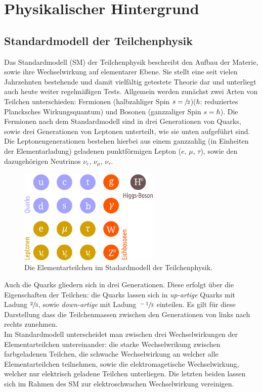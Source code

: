 \chapter{Physikalischer Hintergrund}
%
\section{Standardmodell der Teilchenphysik}
%
Das Standardmodell (SM) der Teilchenphysik beschreibt den Aufbau der Materie, sowie ihre Wechselwirkung auf elementarer Ebene. Sie stellt eine seit vielen Jahrzehnten bestehende und damit vielfältig getestete Theorie dar und unterliegt auch heute weiter regelmäßigen Tests. Allgemein werden zunächst zwei Arten von Teilchen unterschieden: Fermionen (halbzahliger Spin $s=\sfrac{\relax}{2}$)($\hbar$: reduziertes Plancksches Wirkungsquantum) und Bosonen (ganzzaliger Spin $s=\hbar$). Die Fermionen nach dem Standardmodell sind in drei Generationen von Quarks, sowie drei Generationen von Leptonen unterteilt, wie sie unten aufgeführt sind. Die Leptonengenerationen bestehen hierbei aus einem ganzzahlig (in Einheiten der Elementarladung) geladenen punktförmigen Lepton ($e$, $\mu$, $\tau$), sowie den dazugehörigen Neutrinos $\nu_e$, $\nu_\mu$, $\nu_\tau$.
%
\begin{figure}
  \centering
      \includegraphics[width=0.6\textwidth]{content/SM.pdf}
  \caption{Die Elementarteilchen im Stadardmodell der Teilchenphysik.}
\end{figure}
%
Auch die Quarks gliedern sich in drei Generationen. Diese erfolgt über die Eigenschaften der Teilchen: die Quarks lassen sich in \textit{up-artige} Quarks mit Ladung $\sfrac{2}{3}$, sowie \textit{down-artige} mit Ladung $\sfrac{-1}{3}$ einteilen. Es gilt für diese Darstellung dass die Teilchenmassen zwischen den Generationen von links nach rechts zunehmen.\\
Im Standardmodell unterscheidet man zwischen drei Wechselwirkungen der Elementarteilchen untereinander: die starke Wechselwrikung zwischen farbgeladenen Teilchen, die schwache Wechselwirkung an welcher alle Elementarteilchen teilnehmen, sowie die elektromagetische Wechselwirkung, welcher nur elektrisch geladene Teilchen unterliegen. Die letzten beiden lassen sich im Rahmen des SM zur elektroschwachen Wechselwirkung vereinigen.
